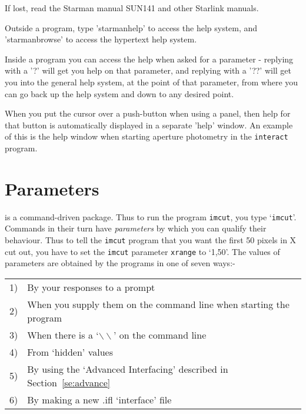If lost, read the Starman manual SUN141 and other Starlink manuals.

Outside a program, type 'starmanhelp' to access the help system, and
  'starmanbrowse' to access the hypertext help system.


  Inside a program you can access the help when asked for a  parameter
  - replying with a '?' will get you help on that parameter, and
  replying with a '??' will get you into the general help system, at
  the point of that parameter, from where you can go back up the  help
  system and down to any desired point.


When you put the cursor over a push-button when using a panel, then
help for that button is automatically displayed in a separate 'help'
window. An example of this is the help window when starting aperture
photometry in the \verb|interact| program.






\section{Parameters} \label{se:param}

\starman is a command-driven package.  Thus to run the program
\verb|imcut|, you  type `\verb|imcut|'. Commands in their turn have
{\em parameters\/} by which you can qualify their behaviour. Thus to
tell the \verb|imcut| program that you want the first 50 pixels in X
cut out, you have to set the \verb|imcut| parameter \verb|xrange| to
`1,50'. The values of parameters are obtained by the programs in one of
seven ways:-

\begin{tabular}{ll} 
\hspace{4ex} 1) & By your responses to a prompt \\
\hspace{4ex} 2) & When you supply them on the command line when starting
		  the program \\
\hspace{4ex} 3) & When there is a `$\backslash\backslash$' on the
                  command line \\
\hspace{4ex} 4) & From `hidden' values \\ 
\hspace{4ex} 5) & By using the `Advanced Interfacing' described in
                  Section~\ref{se:advance} \\
\hspace{4ex} 6) & By making a new .ifl `interface' file \\
\end{tabular}


